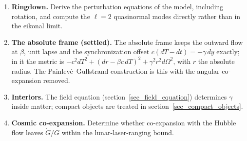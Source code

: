 \begin{enumerate}
    \item \textbf{Ringdown.} Derive the perturbation equations of the model, including rotation, and compute the $\ell=2$ quasinormal modes directly rather than in the eikonal limit.
    \item \textbf{The absolute frame (settled).} The absolute frame keeps the outward flow at $\beta$, unit lapse and the synchronization offset $c(dT-dt)=-\gamma\,dy$ exactly; in it the metric is $-c^2dT^2+(dr-\beta c\,dT)^2+\gamma^2r^2d\Omega^2$, with $r$ the absolute radius. The Painlev\'e--Gullstrand construction is this with the angular co-expansion removed.
    \item \textbf{Interiors.} The field equation (section~\ref{sec_field_equation}) determines $\gamma$ inside matter; compact objects are treated in section~\ref{sec_compact_objects}.
    \item \textbf{Cosmic co-expansion.} Determine whether co-expansion with the Hubble flow leaves $\dot G/G$ within the lunar-laser-ranging bound.
\end{enumerate}
